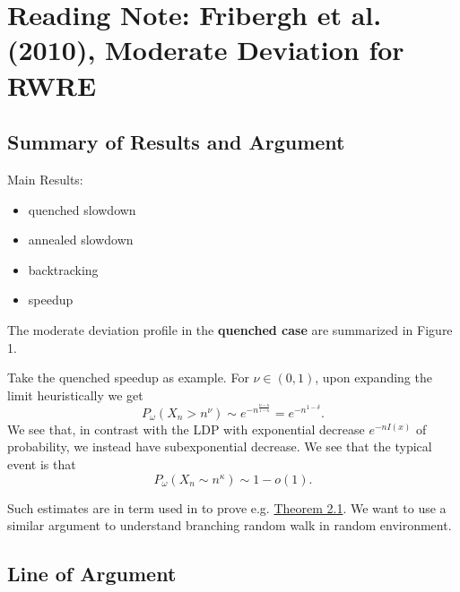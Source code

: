 \section{Reading Note: Fribergh et al. (2010), Moderate Deviation for RWRE}
\label{sec:fribergh10}

\newcommand{\fcite}[2]{\autocite[\href{skim:///Users/xiaoyu/Library/CloudStorage/OneDrive-Personal/Zotero-PC/Fribergh\%20et\%20al_2010_On\%20slowdown\%20and\%20speedup\%20of\%20transient\%20random\%20walks\%20in\%20random\%20environment.pdf\#page=#1}{#2}]{friberghSlowdownSpeedup2010} }

\subsection{Summary of Results and Argument}

Main Results:

\begin{itemize}
	\item \fcite{4}{Theorem~1.2} quenched slowdown
	\item \fcite{5}{Theorem~1.3} annealed slowdown
    \item \fcite{5}{Theorem~1.4} backtracking
    \item \fcite{6}{Theorem~1.5} speedup
\end{itemize}
The moderate deviation profile in the \textbf{quenched case} are summarized in {Figure 1}.

Take the quenched speedup as example. For $\nu \in (0,1)$, upon expanding the limit heuristically we get
\[
	P_\omega \left( X_n > n^ \nu \right) \sim e^{- n^{\frac{\nu - \kappa}{1 - \kappa}}} = e^{-n ^{1 - \delta}}
.\] 
We see that, in contrast with the LDP with exponential decrease $e^{- n I(x)}$ of probability, we instead have subexponential decrease. We see that the typical event is that
\[
	P_\omega(X_n \sim n^\kappa) \sim 1 - o(1)
.\] 

Such estimates are in term used in \cite{gantertMaximalDisplacement2011} to prove e.g. \href{lt://open/xIFUHEJJo0mDxQI2wskWtw}{Theorem 2.1}. We want to use a similar argument to understand branching random walk in random environment.

\subsection{Line of Argument}

